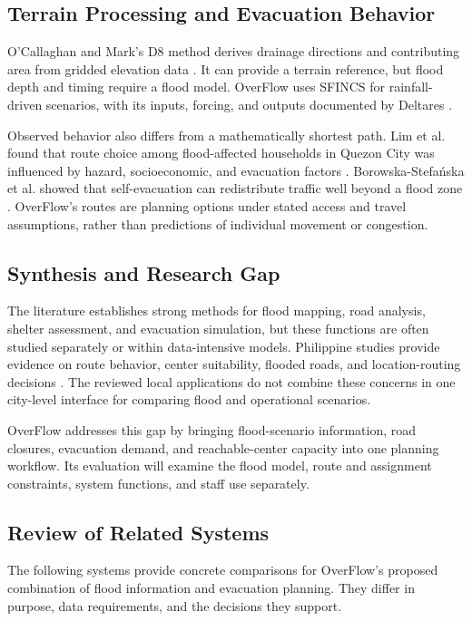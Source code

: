 \subsection{Terrain Processing and Evacuation Behavior}

O'Callaghan and Mark's D8 method derives drainage directions and contributing area from gridded elevation data \cite{ocallaghan1984}. It can provide a terrain reference, but flood depth and timing require a flood model. OverFlow uses SFINCS for rainfall-driven scenarios, with its inputs, forcing, and outputs documented by Deltares \cite{sfincsinput,sfincsdocs,sfincsoutput}.

Observed behavior also differs from a mathematically shortest path. Lim et al. found that route choice among flood-affected households in Quezon City was influenced by hazard, socioeconomic, and evacuation factors \cite{lim2019}. Borowska-Stefańska et al. showed that self-evacuation can redistribute traffic well beyond a flood zone \cite{borowskastefanska2023}. OverFlow's routes are planning options under stated access and travel assumptions, rather than predictions of individual movement or congestion.

\subsection{Synthesis and Research Gap}

The literature establishes strong methods for flood mapping, road analysis, shelter assessment, and evacuation simulation, but these functions are often studied separately or within data-intensive models. Philippine studies provide evidence on route behavior, center suitability, flooded roads, and location-routing decisions \cite{lim2019,bolanio2023,abuzo2024,develuz2023}. The reviewed local applications do not combine these concerns in one city-level interface for comparing flood and operational scenarios.

OverFlow addresses this gap by bringing flood-scenario information, road closures, evacuation demand, and reachable-center capacity into one planning workflow. Its evaluation will examine the flood model, route and assignment constraints, system functions, and staff use separately.

\subsection{Review of Related Systems}

The following systems provide concrete comparisons for OverFlow's proposed combination of flood information and evacuation planning. They differ in purpose, data requirements, and the decisions they support.

